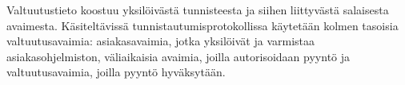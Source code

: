 Valtuutustieto koostuu yksilöivästä tunnisteesta ja siihen liittyvästä salaisesta avaimesta. Käsiteltävissä tunnistautumisprotokollissa käytetään kolmen tasoisia valtuutusavaimia: asiakasavaimia, jotka yksilöivät ja varmistaa asiakasohjelmiston, väliaikaisia avaimia, joilla autorisoidaan pyyntö ja valtuutusavaimia, joilla pyyntö hyväksytään.